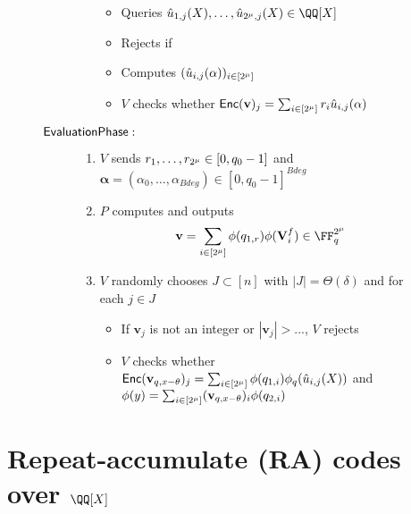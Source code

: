 \documentclass[11pt,letterpaper,usenames,dvipsnames]{article}
\begin{document}
\begin{figure}[H]
\begin{framed}
\begin{description}
\begin{enumerate}
\begin{itemize}
							\item Queries $\hat{u}_{1,j}(X), \ldots, \hat{u}_{\size, j}(X)\in \QQ[X]$
							\item Rejects if
							\item Computes $(\hat{u}_{i,j}(\mathbf \alpha))_{i\in[2^\mu]}$
							\item $V$ checks whether $\mathsf{Enc}(\mathbf v)_j=\sum_{i\in[2^\mu]}r_i\hat{u}_{i,j}(\mathbf{\alpha})$
						\end{itemize}
				\end{enumerate}
		\item[$\mathsf{Evaluation Phase}:$]				
				\begin{enumerate}
					\item $V$ sends $r_1, \ldots, r_{2^\mu}\in[0, q_0-1]$ and $\mathbf \alpha=(\alpha_0, \ldots, \alpha_{Bdeg})\in[0, q_0-1]^{Bdeg}$
					\item $P$ computes and outputs 
					$$\mathbf{v}=\sum_{i\in[\size]}\phi(q_{1,r})\phi(\matrixV^f_i)\in \FF_q^{\size}$$
					\item $V$ randomly chooses $J\subset[n]$ with $|J|=\Theta(\delta)$ and for each $j\in J$
					\begin{itemize}
						\item If $\mathbf v_j$ is not an integer or $|\mathbf v_j|>...$, $V$ rejects
						\item $V$ checks whether $\mathsf{Enc}(\mathbf v_{q, x-\theta})_j=\sum_{i\in[2^\mu]}\phi(q_{1,i})\phi_q(\hat{u}_{i,j}(X))$ and $\phi(y)=\sum_{i\in[2^\mu]}(\mathbf v_{q, x-\theta})_i\phi(q_{2,i})$
					\end{itemize}
				\end{enumerate}
		\end{description}		
	\end{framed}
\end{figure}

\section{Repeat-accumulate (RA) codes over $\QQ[X]$}
\label{section:ra-codes} 

\renewcommand*{\bibfont}{\small}
\printbibliography
\end{document}
